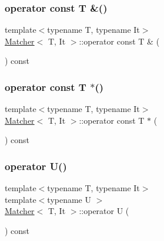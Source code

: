 \mbox{\label{class_matcher_a7b808eac9d5d10c2d417869bf630d6ec}} 
\subsubsection{\texorpdfstring{operator const T \&()}{operator const T \&()}}
{\footnotesize\ttfamily template$<$typename T, typename It$>$ \\
\hyperlink{class_matcher}{Matcher}$<$ T, It $>$\+::operator const T \& (\begin{DoxyParamCaption}{ }\end{DoxyParamCaption}) const\hspace{0.3cm}{\ttfamily [inline]}}

\mbox{\label{class_matcher_ae3f74b07e355126855e40db722c7a51d}} 
\subsubsection{\texorpdfstring{operator const T $\ast$()}{operator const T *()}}
{\footnotesize\ttfamily template$<$typename T, typename It$>$ \\
\hyperlink{class_matcher}{Matcher}$<$ T, It $>$\+::operator const T $\ast$ (\begin{DoxyParamCaption}{ }\end{DoxyParamCaption}) const\hspace{0.3cm}{\ttfamily [inline]}}

\mbox{\label{class_matcher_a0bd21eb19304624235c6cb208fa1216a}} 
\subsubsection{\texorpdfstring{operator U()}{operator U()}}
{\footnotesize\ttfamily template$<$typename T, typename It$>$ \\
template$<$typename U $>$ \\
\hyperlink{class_matcher}{Matcher}$<$ T, It $>$\+::operator U (\begin{DoxyParamCaption}{ }\end{DoxyParamCaption}) const\hspace{0.3cm}{\ttfamily [inline]}}


